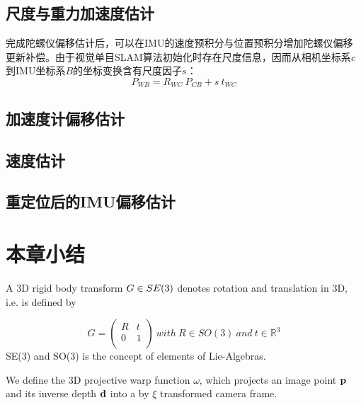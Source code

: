 \subsection{尺度与重力加速度估计}
完成陀螺仪偏移估计后，可以在IMU的速度预积分与位置预积分增加陀螺仪偏移更新补偿。由于视觉单目SLAM算法初始化时存在尺度信息，因而从相机坐标系$c$到IMU坐标系$B$的坐标变换含有尺度因子$s$：
\begin{equation}
\label{•}
P_{W\!B} = R_{WC}\ P_{CB} + s\ t_{WC} 
\end{equation}





\subsection{加速度计偏移估计}



\subsection{速度估计}




\subsection{重定位后的IMU偏移估计}





\section{本章小结}




\iffalse
A 3D rigid body transform $G{\rm{ }} \in {\rm{ }}SE(3)$  denotes rotation and translation in 3D,  i.e. is defined by

\begin{equation}
G=\left(
    \begin{array}{cc}
      R & t \\
      0 & 1 \\
    \end{array}
  \right)
    \ with
    \ R\in SO(3)
    \ and
    \ t\in {\mathbb{R}}^{3}
\end{equation}
SE(3) and SO(3) is the concept of elements of Lie-Algebras.

We define the 3D projective warp function $\omega $, which projects an image point ${\bf{p}}$ and its inverse depth ${\bf{d}}$ into a by $\xi $ transformed camera frame.

